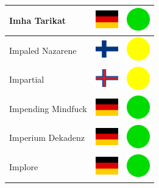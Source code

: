 \documentclass[12pt, a4paper, twoside]{report}
\begin{document}
\begin{center}
\begin{longtable}{|p{5cm}|p{2cm}|p{2cm}|}
Imha Tarikat & \includegraphics[width=1cm]{4x3/de} & \includegraphics[width=1cm]{likes/y} \\ \hline
Impaled Nazarene & \includegraphics[width=1cm]{4x3/fi} & \includegraphics[width=1cm]{likes/m} \\ \hline
Impartial & \includegraphics[width=1cm]{4x3/fo} & \includegraphics[width=1cm]{likes/m} \\ \hline
Impending Mindfuck & \includegraphics[width=1cm]{4x3/de} & \includegraphics[width=1cm]{likes/y} \\ \hline
Imperium Dekadenz & \includegraphics[width=1cm]{4x3/de} & \includegraphics[width=1cm]{likes/y} \\ \hline
Implore & \includegraphics[width=1cm]{4x3/de} & \includegraphics[width=1cm]{likes/y} \\ \hline

\end{longtable}
\end{center}
\end{document}
